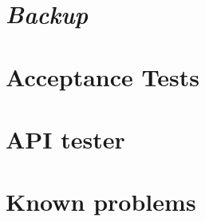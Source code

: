 \begin{appendix}
%
\begin{comment}

\chapter{\textit{Migration of the \appName\ system}}

\end{comment}
\chapter{\textit{Backup}}


\chapter{Acceptance Tests}


\chapter{API tester}



\chapter{Known problems}
\label{chap:knownProblems}


%

\end{appendix}

